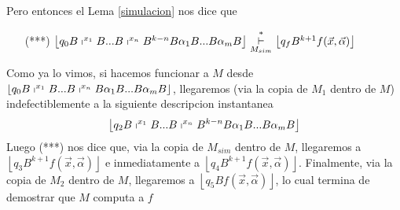 \begin{frame}
  \begin{block}
    \PN Pero entonces el Lema \ref{simulacion} nos dice que

    \begin{enumerate}
    \item[(***)] $\left\lfloor q_{0}B\shortmid ^{x_{1}}B...B\shortmid
    ^{x_{n}}B^{k-n}B\alpha _{1}B...B\alpha _{m}B\right\rfloor \overset{\ast }{%
    \underset{M_{sim}}{\vdash }}\left\lfloor q_{f}B^{k+1}f(\vec{x},\vec{\alpha}%
    )\right\rfloor $
    \end{enumerate}

    Como ya lo vimos, si hacemos funcionar a $M$ desde $\left\lfloor
    q_{0}B\shortmid ^{x_{1}}B...B\shortmid ^{x_{n}}B\alpha _{1}B...B\alpha
    _{m}B\right\rfloor $, llegaremos (via la copia de $M_{1}$ dentro de $M$)
    indefectiblemente a la siguiente descripcion instantanea%
    \begin{equation*}
    \left\lfloor q_{2}B\shortmid ^{x_{1}}B...B\shortmid ^{x_{n}}B^{k-n}B\alpha
    _{1}B...B\alpha _{m}B\right\rfloor
    \end{equation*}%
    Luego (***) nos dice que, via la copia de $M_{sim}$ dentro de $M$,
    llegaremos a $\left\lfloor q_{3}B^{k+1}f(\vec{x},\vec{\alpha})\right\rfloor $
    e inmediatamente a $\left\lfloor q_{4}B^{k+1}f(\vec{x},\vec{\alpha}%
    )\right\rfloor $. Finalmente, via la copia de $M_{2}$ dentro de $M$,
    llegaremos a $\left\lfloor q_{5}Bf(\vec{x},\vec{\alpha})\right\rfloor $, lo
    cual termina de demostrar que $M$ computa a $f$
  \end{block}
\end{frame}
